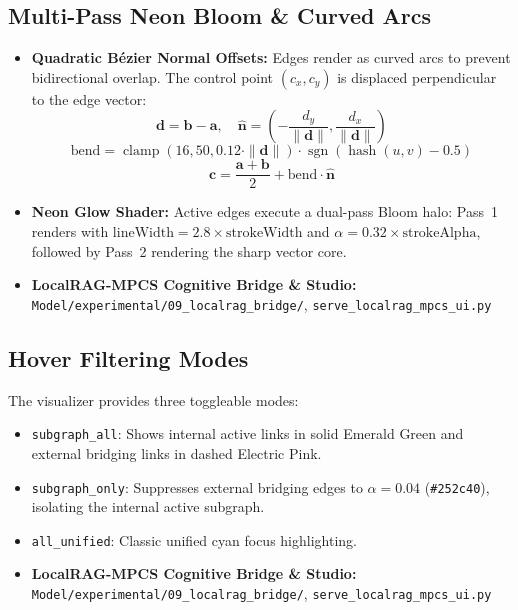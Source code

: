 \documentclass[10pt,twocolumn,letterpaper]{article}
\begin{document}
\subsection{Multi-Pass Neon Bloom \& Curved Arcs}
\begin{itemize}
  \item \textbf{Quadratic B\'ezier Normal Offsets:} Edges render as curved arcs to prevent bidirectional overlap. The control point $(c_x, c_y)$ is displaced perpendicular to the edge vector:
  \begin{equation}
    \mathbf{d} = \mathbf{b} - \mathbf{a}, \quad \hat{\mathbf{n}} = \left(-\frac{d_y}{\|\mathbf{d}\|}, \frac{d_x}{\|\mathbf{d}\|}\right)
  \end{equation}
  \begin{equation}
    \text{bend} = \operatorname{clamp}\left(16, 50, 0.12 \cdot \|\mathbf{d}\|\right) \cdot \operatorname{sgn}(\operatorname{hash}(u, v) - 0.5)
  \end{equation}
  \begin{equation}
    \mathbf{c} = \frac{\mathbf{a} + \mathbf{b}}{2} + \text{bend} \cdot \hat{\mathbf{n}}
  \end{equation}
  \item \textbf{Neon Glow Shader:} Active edges execute a dual-pass Bloom halo: Pass~1 renders with $\text{lineWidth} = 2.8 \times \text{strokeWidth}$ and $\alpha = 0.32 \times \text{strokeAlpha}$, followed by Pass~2 rendering the sharp vector core.
  \item \textbf{LocalRAG-MPCS Cognitive Bridge \& Studio:} \nolinkurl{Model/experimental/09_localrag_bridge/}, \nolinkurl{serve_localrag_mpcs_ui.py}
\end{itemize}

\subsection{Hover Filtering Modes}
The visualizer provides three toggleable modes:
\begin{itemize}
  \item \texttt{subgraph\_all}: Shows internal active links in solid Emerald Green and external bridging links in dashed Electric Pink.
  \item \texttt{subgraph\_only}: Suppresses external bridging edges to $\alpha = 0.04$ (\texttt{\#252c40}), isolating the internal active subgraph.
  \item \texttt{all\_unified}: Classic unified cyan focus highlighting.
  \item \textbf{LocalRAG-MPCS Cognitive Bridge \& Studio:} \nolinkurl{Model/experimental/09_localrag_bridge/}, \nolinkurl{serve_localrag_mpcs_ui.py}
\end{itemize}
\end{document}

